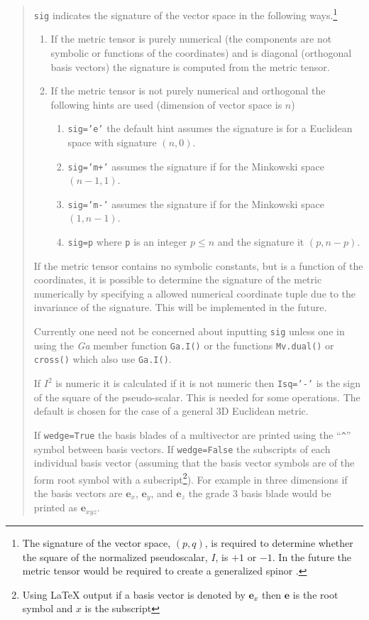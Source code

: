 \documentclass[12pt]{report}
\newcommand{\bm}[1]{\boldsymbol{#1}}
\newcommand{\eb}{\bm{e}}
\newcommand{\T}[1]{\texttt{#1}}
\begin{document}
\begin{quote}
   \T{sig} indicates the signature of the vector space in the following ways.\footnote{The 
   signature of the vector space, $(p,q)$, is required to determine whether the square of
   the normalized pseudoscalar, $I$, is $+1$ or $-1$. In the future the metric tensor would
   be required to create a generalized spinor \cite[p.~106]{Hestenes}.}
   \begin{enumerate}
       \item If the metric tensor is purely numerical (the components are not symbolic or 
             functions of the coordinates) and is diagonal (orthogonal basis vectors) the 
             signature is computed from the metric tensor.
       \item If the metric tensor is not purely numerical and orthogonal the following hints
             are used (dimension of vector space is $n$)
       \begin{enumerate}
       		\item \T{sig='e'} the default hint assumes the signature is for a Euclidean space
       		      with signature $(n,0)$.
       		\item \T{sig='m+'} assumes the signature if for the Minkowski space $(n-1,1)$.
       		\item \T{sig='m-'} assumes the signature if for the Minkowski space $(1,n-1)$.
       		\item \T{sig=p} where \T{p} is an integer $p\le n$ and the signature it $(p,n-p)$. 
       \end{enumerate}
   \end{enumerate}
   If the metric tensor contains no symbolic constants, but is a function of the coordinates, it is
   possible to determine the signature of the metric numerically by specifying a allowed numerical
   coordinate tuple due to the invariance of the signature.  This will be implemented in the future.
   
   Currently one need not be concerned about inputting \T{sig} unless one in using the \emph{Ga} member
   function \T{Ga.I()} or the functions \T{Mv.dual()} or \T{cross()} which also use \T{Ga.I()}.

   If $I^{2}$ is numeric it is calculated if it is not numeric then \T{Isq='-'} is the sign of the square of the pseudo-scalar. This is needed
   for some operations.  The default is chosen for the case of a general 3D Euclidean metric. 

   If \T{wedge=True} the basis blades of a multivector are printed using the ``\T{\^}'' symbol between basis vectors.  If \T{wedge=False} the 
   subscripts of each individual basis vector (assuming that the basis vector symbols are of the form root symbol with a subscript\footnote{Using
   {\LaTeX} output if a basis vector is denoted by $\eb_{x}$ then $\eb$ is the root symbol and $x$ is the subscript}).  For example in three
   dimensions if the basis vectors are $\eb_{x}$,  $\eb_{y}$, and $\eb_{z}$ the grade 3 basis blade would be printed as $\eb_{xyz}$.


\end{quote}
\end{document}
